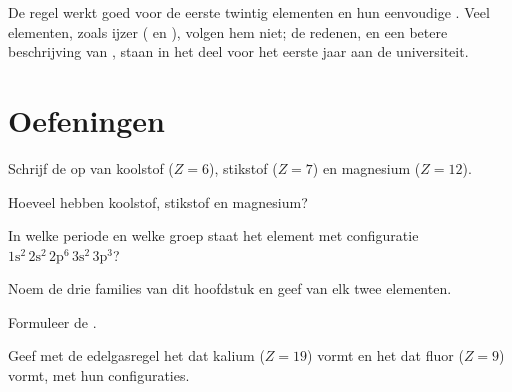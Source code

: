 \begin{remark}\label{rem:g10:electron-shells:limits}
De regel werkt goed voor de eerste twintig elementen en hun eenvoudige
. Veel elementen, zoals ijzer ( en ), volgen
hem niet; de redenen, en een betere beschrijving van , staan in
het deel voor het eerste jaar aan de universiteit.
\end{remark}

\section{Oefeningen}

\begin{exercise}[$\star$]\label{exo:g10:electron-shells:1}
Schrijf de  op van koolstof ($Z = 6$), stikstof
($Z = 7$) en magnesium ($Z = 12$).
\end{exercise}

\begin{exercise}[$\star$]\label{exo:g10:electron-shells:2}
Hoeveel  hebben koolstof, stikstof en magnesium?
\end{exercise}

\begin{exercise}[$\star$]\label{exo:g10:electron-shells:3}
In welke periode en welke groep staat het element met configuratie
$1\mathrm{s}^2\,2\mathrm{s}^2\,2\mathrm{p}^6\,3\mathrm{s}^2\,3\mathrm{p}^3$?
\end{exercise}

\begin{exercise}[$\star$]\label{exo:g10:electron-shells:4}
Noem de drie families van dit hoofdstuk en geef van elk twee elementen.
\end{exercise}

\begin{exercise}[$\star$]\label{exo:g10:electron-shells:5}
Formuleer de .
\end{exercise}

\begin{exercise}[$\star\star$]\label{exo:g10:electron-shells:6}
Geef met de edelgasregel het  dat kalium ($Z = 19$) vormt en het 
dat fluor ($Z = 9$) vormt, met hun configuraties.
\end{exercise}

